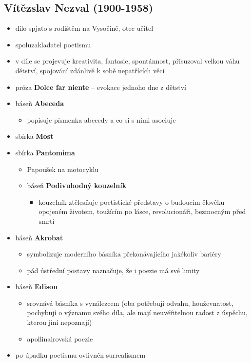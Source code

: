\subsection{Vítězslav Nezval (1900-1958)}
\begin{itemize}
\item dílo spjato s rodištěm na Vysočině, otec učitel
\item spoluzakladatel poetismu
\item v díle se projevuje kreativita, fantasie, spontánnost, přisuzoval velkou váhu dětství, spojování zdánlivě k sobě nepatřících věcí 
\item próza \textbf{Dolce far niente} -- evokace jednoho dne z dětství
\item báseň \textbf{Abeceda}
	\begin{itemize}
	\item popisuje písmenka abecedy a co si s nimi asociuje
	\end{itemize}
\item sbírka \textbf{Most}
\item sbírka \textbf{Pantomima}
	\begin{itemize}
	\item Papoušek na motocyklu
	\item báseň \textbf{Podivuhodný kouzelník}
		\begin{itemize}
		\item kouzelník ztělesňuje poetistické představy o budoucím člověku opojeném životem, toužícím po lásce, revolucionáři, bezmocným před smrtí
	\end{itemize}
	\end{itemize}
\item báseň \textbf{Akrobat}
	\begin{itemize}
	\item symbolizuje moderního básníka překonávajícího jakékoliv bariéry
	\item pád ústřední postavy naznačuje, že i poezie má své limity
	\end{itemize}
\item báseň \textbf{Edison}
	\begin{itemize}
	\item srovnává básníka s vynálezcem (oba potřebují odvahu, houževnatost, pochybují o významu svého díla, ale mají neuvěřitelnou radost z úspěchu, kterou jiní nepoznají)
	\item apollinairovská poezie
	\end{itemize}
\item po úpadku poetismu ovlivněn surrealismem

\end{itemize}

